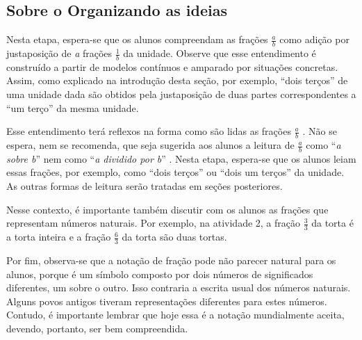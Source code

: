 \subsection{Sobre o Organizando as ideias}



  Nesta etapa, espera-se que os alunos compreendam as frações   $\frac{a}{b}$   como adição por justaposição de   {\it a}   frações   $\frac{1}{b}$   da unidade. Observe que esse entendimento é construído a partir de modelos contínuos e amparado por situações concretas. Assim, como explicado na introdução desta seção, por exemplo,   ``dois terços''   de uma unidade dada são obtidos pela justaposição de duas partes correspondentes a   ``um terço''   da mesma unidade.

  Esse entendimento terá reflexos na forma como são lidas as frações   $\frac{a}{b}$  . Não se espera, nem se recomenda, que seja sugerida aos alunos a leitura de   $\frac{a}{b}$   como   ``{\it a sobre b}''   nem como   ``{\it a dividido por b}''  . Nesta etapa, espera-se que os alunos leiam essas frações, por exemplo, como   ``dois terços''   ou   ``dois um terços''   da unidade. As outras formas de leitura serão tratadas em seções posteriores.

  Nesse contexto, é importante também discutir com os alunos as frações que representam números naturais. Por exemplo, na atividade 2, a fração   $\frac{3}{3}$   da torta é a torta inteira e a fração   $\frac{6}{3}$   da torta são duas tortas.

  Por fim, observa-se que a notação de fração pode não parecer natural para os alunos, porque é um símbolo composto por dois números de significados diferentes, um sobre o outro. Isso contraria a escrita usual dos números naturais. Alguns povos antigos tiveram representações diferentes para estes números.  Contudo, é importante lembrar que hoje essa é a notação mundialmente aceita, devendo, portanto, ser bem compreendida.

\Bg

